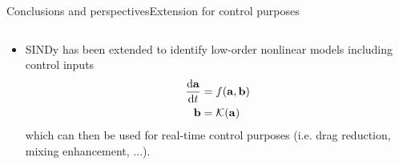 \documentclass[usenames,dvipsnames,svgnames,10pt,aspectratio=169]{beamer}
\begin{document}
\begin{frame}[t, c]{Conclusions and perspectives}{Extension for control purposes}
	\begin{columns}
		\begin{column}{.6\textwidth}
			\begin{itemize}
				\item SINDy has been extended to identify low-order nonlinear models including control inputs
				\begin{equation}
					\begin{aligned}
						\displaystyle \frac{\mathrm{d} {\bf a}}{\mathrm{d}t} & = f({\bf a}, {\bf b})\\
						{\bf b} & = \mathcal{K}({\bf a})
					\end{aligned}
					\notag
				\end{equation}
				which can then be used for real-time control purposes (i.e. drag reduction, mixing enhancement, ...).

					\bigskip


\end{itemize}
\end{column}
\end{columns}
\end{frame}
\end{document}
